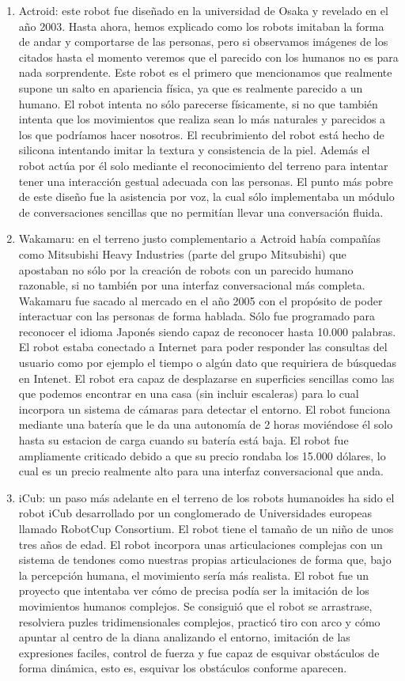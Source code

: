 \begin{enumerate}
  \item Actroid: este robot fue diseñado en la universidad de Osaka y revelado en el año 2003. Hasta ahora, hemos explicado como los robots imitaban la forma de andar y comportarse de las personas, pero si observamos imágenes de los citados hasta el momento veremos que el parecido con los humanos no es para nada sorprendente. Este robot es el primero que mencionamos que realmente supone un salto en apariencia física, ya que es realmente parecido a un humano. El robot intenta no sólo parecerse físicamente, si no que también intenta que los movimientos que realiza sean lo más naturales y parecidos a los que podríamos hacer nosotros. El recubrimiento del robot está hecho de silicona intentando imitar la textura y consistencia de la piel. Además el robot actúa por él solo mediante el reconocimiento del terreno para intentar tener una interacción gestual adecuada con las personas. El punto más pobre de este diseño fue la asistencia por voz, la cual sólo implementaba un módulo de conversaciones sencillas que no permitían llevar una conversación fluida.
  \item Wakamaru: en el terreno justo complementario a Actroid había compañías como Mitsubishi Heavy Industries (parte del grupo Mitsubishi) que apostaban no sólo por la creación de robots con un parecido humano razonable, si no también por una interfaz conversacional más completa. Wakamaru fue sacado al mercado en el año 2005 con el propósito de poder interactuar con las personas de forma hablada. Sólo fue programado para reconocer el idioma Japonés siendo capaz de reconocer hasta 10.000 palabras. El robot estaba conectado a Internet para poder responder las consultas del usuario como por ejemplo el tiempo o algún dato que requiriera de búsquedas en Intenet. El robot era capaz de desplazarse en superficies sencillas como las que podemos encontrar en una casa (sin incluir escaleras) para lo cual incorpora un sistema de cámaras para detectar el entorno. El robot funciona mediante una batería que le da una autonomía de 2 horas moviéndose él solo hasta su estacion de carga cuando su batería está baja. El robot fue ampliamente criticado debido a que su precio rondaba los 15.000 dólares, lo cual es un precio realmente alto para una interfaz conversacional que anda.
  \item iCub: un paso más adelante en el terreno de los robots humanoides ha sido el robot iCub desarrollado por un conglomerado de Universidades europeas llamado RobotCup Consortium. El robot tiene el tamaño de un niño de unos tres años de edad. El robot incorpora unas articulaciones complejas con un sistema de tendones como nuestras propias articulaciones de forma que, bajo la percepción humana, el movimiento sería más realista. El robot fue un proyecto que intentaba ver cómo de precisa podía ser la imitación de los movimientos humanos complejos. Se consiguió que el robot se arrastrase, resolviera puzles tridimensionales complejos, practicó tiro con arco y cómo apuntar al centro de la diana analizando el entorno, imitación de las expresiones faciles, control de fuerza y fue capaz de esquivar obstáculos de forma dinámica, esto es, esquivar los obstáculos conforme aparecen.

\end{enumerate}

